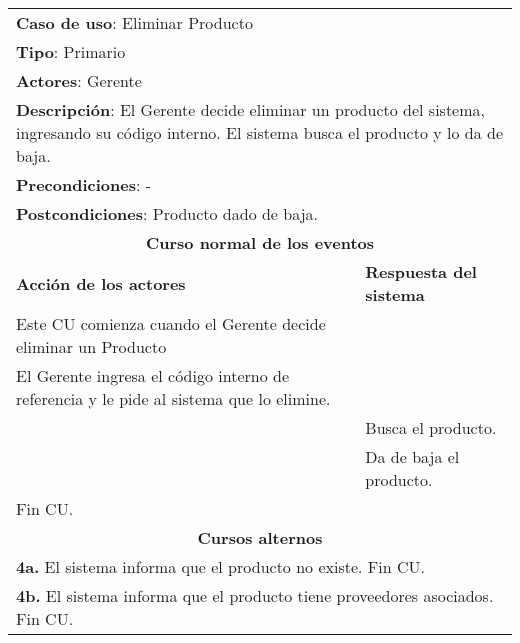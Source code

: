 \begin{longtable}{ |p{8cm}|p{8cm}| }
		\hline
		\multicolumn{2}{|p{16cm}|}{\textbf{Caso de uso}: Eliminar Producto }\\
		\multicolumn{2}{|p{16cm}|}{\textbf{Tipo}: Primario }\\
		\multicolumn{2}{|p{16cm}|}{\textbf{Actores}: Gerente }\\
		\multicolumn{2}{|p{16cm}|}{\textbf{Descripción}: El Gerente decide eliminar un producto del sistema, ingresando su código interno. El sistema busca el producto y lo da de baja. }\\
		\multicolumn{2}{|p{16cm}|}{\textbf{Precondiciones}: -}\\
		\multicolumn{2}{|p{16cm}|}{\textbf{Postcondiciones}: Producto dado de baja. }\\
		\hline
		\multicolumn{2}{|c|}{\textbf{Curso normal de los eventos}}\\
		\hline
		\textbf{Acción de los actores} & \textbf{Respuesta del sistema}\\
		\hline
			\inc Este CU comienza cuando el Gerente decide eliminar un Producto & \\
			\hline
			\inc El Gerente ingresa el código interno de referencia y le pide al sistema que lo elimine.&\\
			\hline
			& \inc Busca el producto.\\
			\hline
			& \inc Da de baja el producto.\\
			\hline
			\inc Fin CU. & \\
		\hline
		\multicolumn{2}{|c|}{\textbf{Cursos alternos}}\\
		\hline
		\multicolumn{2}{|p{16cm}|}{\textbf{4a. }El sistema informa que el producto no existe. Fin CU.}\\
		\hline
		\multicolumn{2}{|p{16cm}|}{\textbf{4b. }El sistema informa que el producto tiene proveedores asociados. Fin CU.}\\
		\hline
	\end{longtable}
